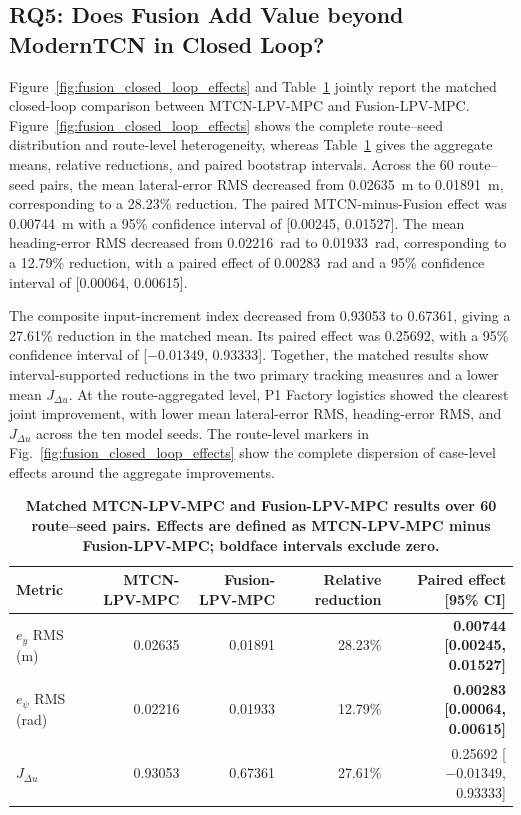 \documentclass{ieeeaccess}
\begin{document}
\subsection{RQ5: Does Fusion Add Value beyond ModernTCN in Closed Loop?}

Figure~\ref{fig:fusion_closed_loop_effects} and Table~\ref{tab:five_source_closed_loop}
jointly report the matched closed-loop comparison between MTCN-LPV-MPC and
Fusion-LPV-MPC. Figure~\ref{fig:fusion_closed_loop_effects} shows the complete
route--seed distribution and route-level heterogeneity, whereas
Table~\ref{tab:five_source_closed_loop} gives the aggregate means, relative
reductions, and paired bootstrap intervals. Across the 60 route--seed
pairs, the mean lateral-error RMS decreased from 0.02635~m to 0.01891~m,
corresponding to a 28.23\% reduction. The paired MTCN-minus-Fusion effect was
0.00744~m with a 95\% confidence interval of [0.00245, 0.01527]. The mean
heading-error RMS decreased from 0.02216~rad to 0.01933~rad, corresponding to
a 12.79\% reduction, with a paired effect of 0.00283~rad and a 95\% confidence
interval of [0.00064, 0.00615].

The composite input-increment index decreased from 0.93053 to 0.67361, giving
a 27.61\% reduction in the matched mean. Its paired effect was 0.25692, with a
95\% confidence interval of [$-0.01349$, 0.93333]. Together, the matched results
show interval-supported reductions in the two primary tracking measures and a
lower mean $J_{\Delta u}$. At the route-aggregated level, P1 Factory logistics
showed the clearest joint improvement, with lower mean lateral-error RMS,
heading-error RMS, and $J_{\Delta u}$ across the ten model seeds. The
route-level markers in Fig.~\ref{fig:fusion_closed_loop_effects} show the
complete dispersion of case-level effects around the aggregate improvements.

\begin{table}[!tbp]
\centering
\caption{\textbf{Matched MTCN-LPV-MPC and Fusion-LPV-MPC results over 60 route--seed pairs. Effects are defined as MTCN-LPV-MPC minus Fusion-LPV-MPC; boldface intervals exclude zero.}}
\label{tab:five_source_closed_loop}
\scriptsize
\setlength{\tabcolsep}{4pt}
\begin{tabular}{|l|r|r|r|r|}
\hline
Metric & MTCN-LPV-MPC & Fusion-LPV-MPC & Relative reduction & Paired effect [95\% CI] \\
\hline
$e_y$ RMS (m)
& 0.02635 & 0.01891 & 28.23\%
& \textbf{0.00744 [0.00245, 0.01527]} \\
$e_\psi$ RMS (rad)
& 0.02216 & 0.01933 & 12.79\%
& \textbf{0.00283 [0.00064, 0.00615]} \\
$J_{\Delta u}$
& 0.93053 & 0.67361 & 27.61\%
& 0.25692 [$-0.01349$, 0.93333] \\
\hline
\end{tabular}
\end{table}
\end{document}
